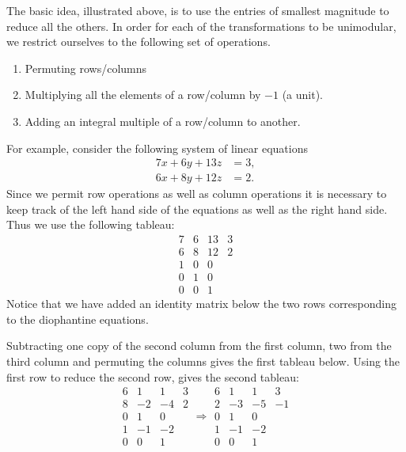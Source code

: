 The basic idea, illustrated above, is to use the entries of smallest
magnitude  to reduce all the others.  In order for each of the
transformations to be unimodular, we restrict ourselves to the following
set of operations.
\begin{enumerate}
\item Permuting rows/columns
\item Multiplying all the elements of a row/column by $-1$ (a unit).
\item Adding an integral multiple of a row/column to another.
\end{enumerate}

For example, consider the following system of linear equations
\[
\begin{aligned}
  7x + 6y + 13z & = 3,\\
  6x + 8y + 12z & = 2.
\end{aligned}
\]
Since we permit row operations as well as column operations it is
necessary to keep track of the left hand side of the equations as well
as the right hand side.  Thus we use the following tableau: 
\[
\begin{array}{rrrr}
7 & 6 & 13 & 3 \\
6 & 8 & 12 & 2 \\
1 & 0 & 0 &  \\
0 & 1 & 0 &  \\
0 & 0 & 1 &  
\end{array}
\]
Notice that we have added an identity matrix below the two rows
corresponding to the diophantine equations.

Subtracting one copy of the second column from the first column,
two from the third column and permuting the columns gives the
first tableau below.  Using the first row to reduce the second row,
gives the second tableau:
\[
\begin{array}{rrrr}
6 & 1 & 1 & 3 \\
8 & -2 & -4 & 2 \\
0 & 1 & 0 &  \\
1 & -1 & -2 &  \\
0 & 0 & 1 &  
\end{array}
\Longrightarrow
\begin{array}{rrrr}
6 & 1 & 1 & 3 \\
2 & -3 & -5 & -1 \\
0 & 1 & 0 &  \\
1 & -1 & -2 &  \\
0 & 0 & 1 &  
\end{array}
\]

